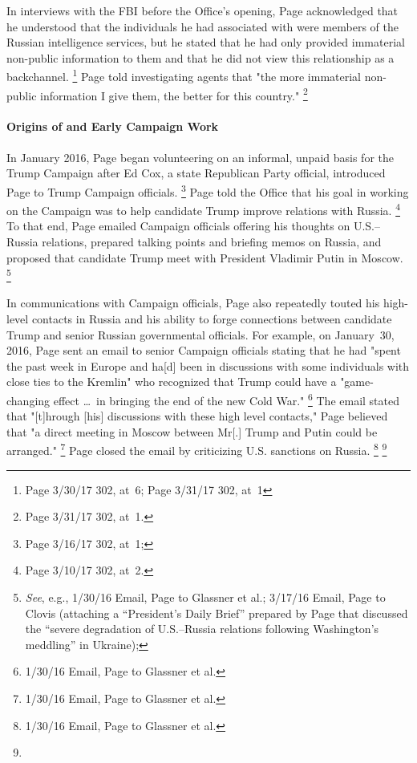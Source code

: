In interviews with the FBI before the Office's opening, Page acknowledged that he understood that the individuals he had associated with were members of the Russian intelligence services, but he stated that he had only provided immaterial non-public information to them and that he did not view this relationship as a backchannel.%
\footnote{Page 3/30/17 302, at~6; Page 3/31/17 302, at~1}
Page told investigating agents that "the more immaterial non-public information I give them, the better for this country."%
\footnote{Page 3/31/17 302, at~1.}

\paragraph{Origins of and Early Campaign Work}

In January 2016, Page began volunteering on an informal, unpaid basis for the Trump Campaign after Ed Cox, a state Republican Party official, introduced Page to Trump Campaign officials.%
\footnote{Page 3/16/17 302, at~1; }
Page told the Office that his goal in working on the Campaign was to help candidate Trump improve relations with Russia.%
\footnote{Page 3/10/17 302, at~2.}
To that end, Page emailed Campaign officials offering his thoughts on U.S.--Russia relations, prepared talking points and briefing memos on Russia, and proposed that candidate Trump meet with President Vladimir Putin in Moscow.%
\footnote{\textit{See}, e.g., 1/30/16 Email, Page to Glassner et al.;
3/17/16 Email, Page to Clovis (attaching a ``President's Daily Brief\thinspace'' prepared by Page that discussed the ``severe degradation of U.S.--Russia relations following Washington's meddling'' in Ukraine); }

In communications with Campaign officials, Page also repeatedly touted his high-level contacts in Russia and his ability to forge connections between candidate Trump and senior Russian governmental officials.
For example, on January~30, 2016, Page sent an email to senior Campaign officials stating that he had "spent the past week in Europe and ha[d] been in discussions with some individuals with close ties to the Kremlin" who recognized that Trump could have a "game-changing effect \dots\ in bringing the end of the new Cold War."%
\footnote{1/30/16 Email, Page to Glassner et al.}
The email stated that "[t]hrough [his] discussions with these high level contacts," Page believed that "a direct meeting in Moscow between Mr[.] Trump and Putin could be arranged."%
\footnote{1/30/16 Email, Page to Glassner et al.}
Page closed the email by criticizing U.S. sanctions on Russia.%
\footnote{1/30/16 Email, Page to Glassner et al.}
\footnote{}

